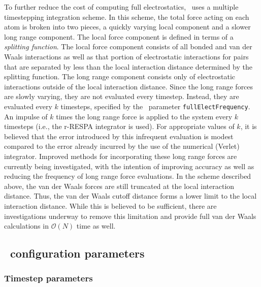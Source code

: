 To further reduce the cost of computing full electrostatics, 
\NAMD\ uses a multiple timestepping integration scheme.  In this scheme, 
the total force acting on each atom is broken into two pieces, a quickly varying local 
component and a slower long range component.  
The local force component is defined in terms of a {\it splitting function}.  The local force component consists of all bonded and van der Waals interactions
as well as that portion of electrostatic interactions for pairs that are separated by less than the local interaction distance determined by the splitting function.  
The long range component consists only of 
electrostatic interactions outside of the local interaction distance.
Since the long range forces are slowly varying, they are not evaluated
every timestep.  Instead, they are evaluated every $k$ timesteps,
specified by the \NAMD\ parameter {\tt fullElectFrequency}.  
An impulse of $k$ times the long range force is applied to the system
every $k$ timesteps (i.e., the r-RESPA integrator is used).
For appropriate values of $k$,
it is believed that the error introduced by this infrequent evaluation
is modest compared to the error already incurred by the use of the numerical
(Verlet) integrator.  
Improved methods for incorporating these long range forces
are currently being investigated, 
with the intention of improving accuracy as well as 
reducing the frequency of long range force evaluations.  
\prettypar
In the scheme described above, the van der Waals forces are still 
truncated at the local interaction distance.  
Thus, the van der Waals cutoff distance 
forms a lower limit to the local interaction distance.  While this is
believed to be sufficient, there are investigations underway to remove
this limitation and provide full van der Waals calculations in 
${\mathcal O}(N)$ time as well.  


\subsection{\NAMD\ configuration parameters}
\label{section:config_basic}

\subsubsection{Timestep parameters}

